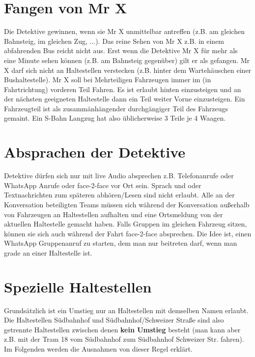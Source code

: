 \documentclass[12pt,a4paper]{article}
\begin{document}
\section{Fangen von Mr X}
Die Detektive gewinnen, wenn sie Mr X unmittelbar antreffen (z.B. am gleichen Bahnsteig, im gleichen Zug, ...).
Das reine Sehen von Mr X z.B. in einem abfahrenden Bus reicht nicht aus.
Erst wenn die Detektive Mr X für mehr als eine Minute sehen können (z.B. am Bahnsteig gegenüber) gilt er als gefangen.
Mr X darf sich nicht an Haltestellen verstecken (z.B. hinter dem Wartehäuschen einer Bushaltestelle).
Mr X soll bei Mehrteiligen Fahrzeugen immer im (in Fahrtrichtung) vorderen Teil Fahren.
Es ist erlaubt hinten einzusteigen und an der nächsten geeigneten Haltestelle dann ein Teil weiter Vorne einzusteigen.
Ein Fahrzeugteil ist als zusammänhängender durchgängiger Teil des Fahrzeugs gemaint.
Ein S-Bahn Langzug hat also üblicherweise 3 Teile je 4 Waagen.

\section{Absprachen der Detektive}
Detektive dürfen sich nur mit live Audio absprechen z.B. Telefonanrufe oder WhatsApp Anrufe oder face-2-face vor Ort sein.
Sprach und oder Textnachrichten zum späteren abhören/Lesen sind nicht erlaubt.
Alle an der Konversation beteiligten Teams müssen sich während der Konversation außerhalb von Fahrzeugen an Haltestellen aufhalten und eine Ortsmeldung von der aktuellen Haltestelle gemacht haben.
Falls Gruppen im gleichen Fahrzeug sitzen, können sie sich auch während der Fahrt face-2-face absprechen.
Die Idee ist, einen WhatsApp Gruppenanruf zu starten, dem man nur beitreten darf, wenn man grade an einer Haltestelle ist.

\section{Spezielle Haltestellen}
Grundsätzlich ist ein Umstieg nur an Haltestellen mit demselben Namen erlaubt. 
Die Haltestellen Südbahnhof und Südbahnhof/Schweizer Straße sind also getrennte Haltestellen zwischen denen \textbf{kein Umstieg} besteht (man kann aber z.B. mit der Tram 18 vom Südbahnhof zum Südbahnhof Schweizer Str. fahren).
Im Folgenden werden die Ausnahmen von dieser Regel erklärt.
\end{document}
